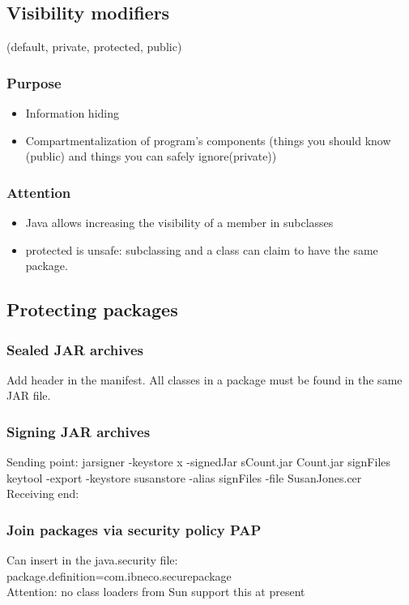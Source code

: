 \documentclass[10pt]{article}
\begin{document}
\subsection{Visibility modifiers}
(default, private, protected, public)
\subsubsection{Purpose}
\begin{itemize}
	\item Information hiding
	\item Compartmentalization of program's components (things you should know (public) and things you can safely ignore(private))
\end{itemize}
\subsubsection{Attention}
\begin{itemize}
	\item Java allows increasing the visibility of a member in subclasses
	\item protected is unsafe:  subclassing and a class can claim to have the same package.
\end{itemize}
\subsection{Protecting packages}
\subsubsection{Sealed JAR archives}
Add header in the manifest. 
All classes in a package must be found in the same JAR file.
\subsubsection{Signing JAR archives}
Sending point:
jarsigner -keystore x -signedJar sCount.jar Count.jar signFiles\\ 
keytool -export -keystore susanstore -alias signFiles -file SusanJones.cer\\
Receiving end:\\

\subsubsection{Join packages via security policy PAP}
Can insert in the java.security file:\\
package.definition=com.ibneco.securepackage\\
Attention: no class loaders from Sun support this at present
\end{document}
